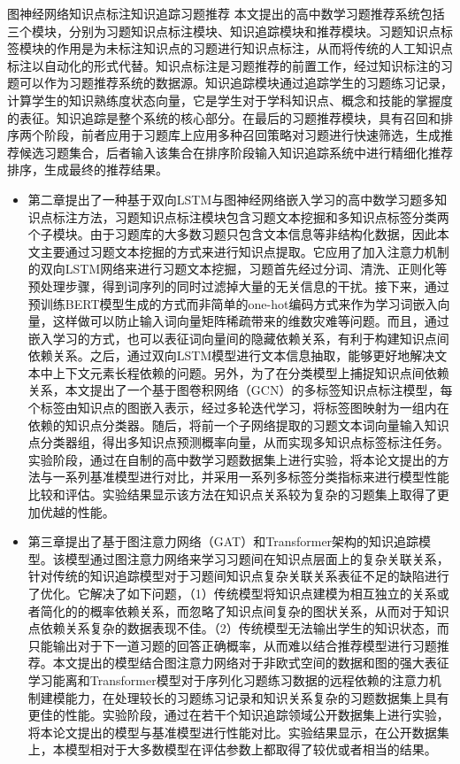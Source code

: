 \begin{abstractC}{图神经网络}{知识点标注}{知识追踪}{习题推荐}{}
    本文提出的高中数学习题推荐系统包括三个模块，分别为习题知识点标注模块、知识追踪模块和推荐模块。习题知识点标签模块的作用是为未标注知识点的习题进行知识点标注，从而将传统的人工知识点标注以自动化的形式代替。知识点标注是习题推荐的前置工作，经过知识标注的习题可以作为习题推荐系统的数据源。知识追踪模块通过追踪学生的习题练习记录，计算学生的知识熟练度状态向量，它是学生对于学科知识点、概念和技能的掌握度的表征。知识追踪是整个系统的核心部分。在最后的习题推荐模块，具有召回和排序两个阶段，前者应用于习题库上应用多种召回策略对习题进行快速筛选，生成推荐候选习题集合，后者输入该集合在排序阶段输入知识追踪系统中进行精细化推荐排序，生成最终的推荐结果。
    \begin{itemize}
        \item 第二章提出了一种基于双向LSTM与图神经网络嵌入学习的高中数学习题多知识点标注方法，习题知识点标注模块包含习题文本挖掘和多知识点标签分类两个子模块。由于习题库的大多数习题只包含文本信息等非结构化数据，因此本文主要通过习题文本挖掘的方式来进行知识点提取。它应用了加入注意力机制的双向LSTM网络来进行习题文本挖掘，习题首先经过分词、清洗、正则化等预处理步骤，得到词序列的同时过滤掉大量的无关信息的干扰。接下来，通过预训练BERT模型生成的方式而非简单的one-hot编码方式来作为学习词嵌入向量，这样做可以防止输入词向量矩阵稀疏带来的维数灾难等问题。而且，通过嵌入学习的方式，也可以表征词向量间的隐藏依赖关系，有利于构建知识点间依赖关系。之后，通过双向LSTM模型进行文本信息抽取，能够更好地解决文本中上下文元素长程依赖的问题。另外，为了在分类模型上捕捉知识点间依赖关系，本文提出了一个基于图卷积网络（GCN）的多标签知识点标注模型，每个标签由知识点的图嵌入表示，经过多轮迭代学习，将标签图映射为一组内在依赖的知识点分类器。随后，将前一个子网络提取的习题文本词向量输入知识点分类器组，得出多知识点预测概率向量，从而实现多知识点标签标注任务。实验阶段，通过在自制的高中数学习题数据集上进行实验，将本论文提出的方法与一系列基准模型进行对比，并采用一系列多标签分类指标来进行模型性能比较和评估。实验结果显示该方法在知识点关系较为复杂的习题集上取得了更加优越的性能。
        \item 第三章提出了基于图注意力网络（GAT）和Transformer架构的知识追踪模型。该模型通过图注意力网络来学习习题间在知识点层面上的复杂关联关系，针对传统的知识追踪模型对于习题间知识点复杂关联关系表征不足的缺陷进行了优化。它解决了如下问题，（1）传统模型将知识点建模为相互独立的关系或者简化的的概率依赖关系，而忽略了知识点间复杂的图状关系，从而对于知识点依赖关系复杂的数据表现不佳。（2）传统模型无法输出学生的知识状态，而只能输出对于下一道习题的回答正确概率，从而难以结合推荐模型进行习题推荐。本文提出的模型结合图注意力网络对于非欧式空间的数据和图的强大表征学习能离和Transformer模型对于序列化习题练习数据的远程依赖的注意力机制建模能力，在处理较长的习题练习记录和知识关系复杂的习题数据集上具有更佳的性能。实验阶段，通过在若干个知识追踪领域公开数据集上进行实验，将本论文提出的模型与基准模型进行性能对比。实验结果显示，在公开数据集上，本模型相对于大多数模型在评估参数上都取得了较优或者相当的结果。

\end{itemize}
\end{abstractC}
